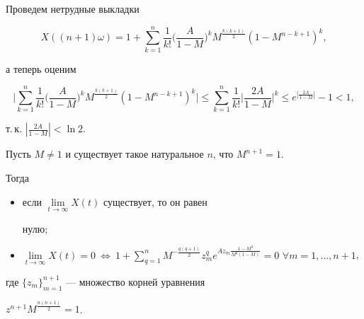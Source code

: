  


\begin{pf} 


Проведем нетрудные выкладки 


$$ 


X((n+1)\omega)=1+\sum^n_{k=1}\frac{1}{k!} 


\bigg(\frac{A}{1-M} \bigg)^k M^{\frac{k(k+1)}{2}} 


(1-M^{n-k+1})^k, 


$$ 


а теперь оценим 


$$ 


\bigg|\sum^n_{k=1}\frac{1}{k!}\bigg(\frac{A}{1-M} \bigg)^k 


M^{\frac{k(k+1)}{2}}(1-M^{n-k+1})^k\bigg|\le 


\sum^n_{k=1}\frac{1}{k!}\bigg|\frac{2A}{1-M} \bigg|^k 


\le e^{|\frac{2A}{1-M}|}-1<1, 


$$ 


т.\,к. $|\frac{2A}{1-M}|<\ln2$. 


\end{pf} 


 


\begin{thm} 


Пусть $M\ne1$ и существует такое натуральное $n$, что $M^{n+1}=1$. 


Тогда 


\begin{itemize} 


\item[1)] если $\lim\limits_{t\to\infty}X(t)$ существует, то он равен 


нулю$;$ 


\item[2)] $\lim\limits_{t\to\infty}X(t)=0\ \Leftrightarrow\ 


1+\sum\limits^n_{q=1}M^{-\frac{q(q+1)}{2}}z^q_m 


e^{Az_m\frac{1-M^q}{M^q(1-M)}}=0$\; $\forall m=1,\dotsc,n+1$, 


\end{itemize}





где $\{z_m\}^{n+1}_{m=1}$ --- множество корней уравнения 


$z^{n+1}M^{\frac{n(n+1)}{2}}=1$. 


\end{thm} 



